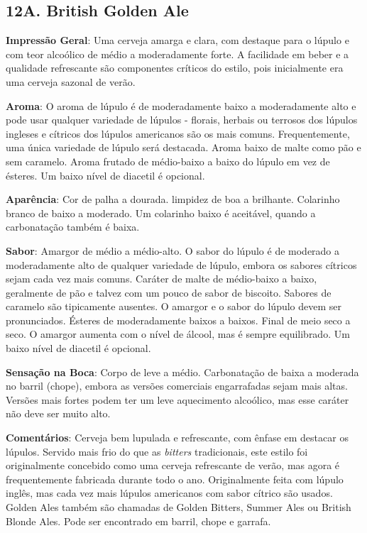 \subsection*{12A. British Golden Ale}
\textbf{Impressão Geral}: Uma cerveja amarga e clara, com destaque para o lúpulo e com teor alcoólico de médio a moderadamente forte. A facilidade em beber e a qualidade refrescante são componentes críticos do estilo, pois inicialmente era uma cerveja sazonal de verão.

\textbf{Aroma}: O aroma de lúpulo é de moderadamente baixo a moderadamente alto e pode usar qualquer variedade de lúpulos - florais, herbais ou terrosos dos lúpulos ingleses e cítricos dos lúpulos americanos são os mais comuns. Frequentemente, uma única variedade de lúpulo será destacada. Aroma baixo de malte como pão e sem caramelo. Aroma frutado de médio-baixo a baixo do lúpulo em vez de ésteres. Um baixo nível de diacetil é opcional.

\textbf{Aparência}: Cor de palha a dourada. limpidez de boa a brilhante. Colarinho branco de baixo a moderado. Um colarinho baixo é aceitável, quando a carbonatação também é baixa.

\textbf{Sabor}: Amargor de médio a médio-alto. O sabor do lúpulo é de moderado a moderadamente alto de qualquer variedade de lúpulo, embora os sabores cítricos sejam cada vez mais comuns. Caráter de malte de médio-baixo a baixo, geralmente de pão e talvez com um pouco de sabor de biscoito. Sabores de caramelo são tipicamente ausentes. O amargor e o sabor do lúpulo devem ser pronunciados. Ésteres de moderadamente baixos a baixos. Final de meio seco a seco. O amargor aumenta com o nível de álcool, mas é sempre equilibrado. Um baixo nível de diacetil é opcional.

\textbf{Sensação na Boca}: Corpo de leve a médio. Carbonatação de baixa a moderada no barril (chope), embora as versões comerciais engarrafadas sejam mais altas. Versões mais fortes podem ter um leve aquecimento alcoólico, mas esse caráter não deve ser muito alto.

\textbf{Comentários}: Cerveja bem lupulada e refrescante, com ênfase em destacar os lúpulos. Servido mais frio do que as \textit{bitters} tradicionais, este estilo foi originalmente concebido como uma cerveja refrescante de verão, mas agora é frequentemente fabricada durante todo o ano. Originalmente feita com lúpulo inglês, mas cada vez mais lúpulos americanos com sabor cítrico são usados. Golden Ales também são chamadas de Golden Bitters, Summer Ales ou British Blonde Ales. Pode ser encontrado em barril, chope e garrafa.

